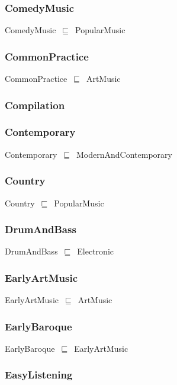 \documentclass{article}
\begin{document}
\subsubsection*{ComedyMusic}

ComedyMusic~\ensuremath{\sqsubseteq}~PopularMusic~

\subsubsection*{CommonPractice}

CommonPractice~\ensuremath{\sqsubseteq}~ArtMusic~

\subsubsection*{Compilation}

\subsubsection*{Contemporary}

Contemporary~\ensuremath{\sqsubseteq}~ModernAndContemporary~

\subsubsection*{Country}

Country~\ensuremath{\sqsubseteq}~PopularMusic~

\subsubsection*{DrumAndBass}

DrumAndBass~\ensuremath{\sqsubseteq}~Electronic~

\subsubsection*{EarlyArtMusic}

EarlyArtMusic~\ensuremath{\sqsubseteq}~ArtMusic~

\subsubsection*{EarlyBaroque}

EarlyBaroque~\ensuremath{\sqsubseteq}~EarlyArtMusic~

\subsubsection*{EasyListening}
\end{document}
